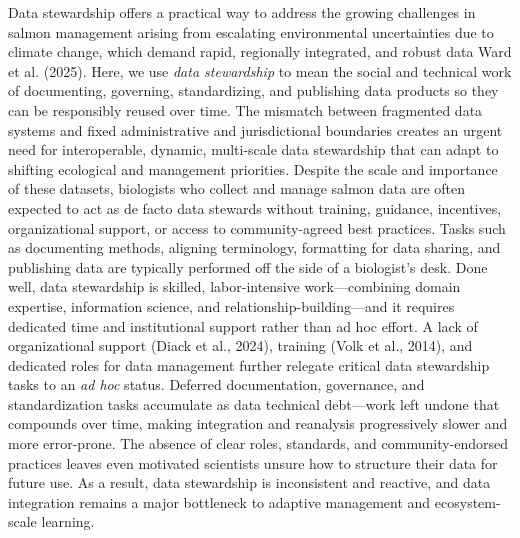 \documentclass[
  letterpaper,
  DIV=11,
  numbers=noendperiod]{scrartcl}
\begin{document}
Data stewardship offers a practical way to address the growing
challenges in salmon management arising from escalating environmental
uncertainties due to climate change, which demand rapid, regionally
integrated, and robust data Ward et al. (2025). Here, we use \emph{data
stewardship} to mean the social and technical work of documenting,
governing, standardizing, and publishing data products so they can be
responsibly reused over time. The mismatch between fragmented data
systems and fixed administrative and jurisdictional boundaries creates
an urgent need for interoperable, dynamic, multi-scale data stewardship
that can adapt to shifting ecological and management priorities. Despite
the scale and importance of these datasets, biologists who collect and
manage salmon data are often expected to act as de facto data stewards
without training, guidance, incentives, organizational support, or
access to community-agreed best practices. Tasks such as documenting
methods, aligning terminology, formatting for data sharing, and
publishing data are typically performed off the side of a biologist's
desk. Done well, data stewardship is skilled, labor-intensive
work---combining domain expertise, information science, and
relationship-building---and it requires dedicated time and institutional
support rather than ad hoc effort. A lack of organizational support
(Diack et al., 2024), training (Volk et al., 2014), and dedicated roles
for data management further relegate critical data stewardship tasks to
an \emph{ad hoc} status. Deferred documentation, governance, and
standardization tasks accumulate as data technical debt---work left
undone that compounds over time, making integration and reanalysis
progressively slower and more error-prone. The absence of clear roles,
standards, and community-endorsed practices leaves even motivated
scientists unsure how to structure their data for future use. As a
result, data stewardship is inconsistent and reactive, and data
integration remains a major bottleneck to adaptive management and
ecosystem-scale learning.
\end{document}
